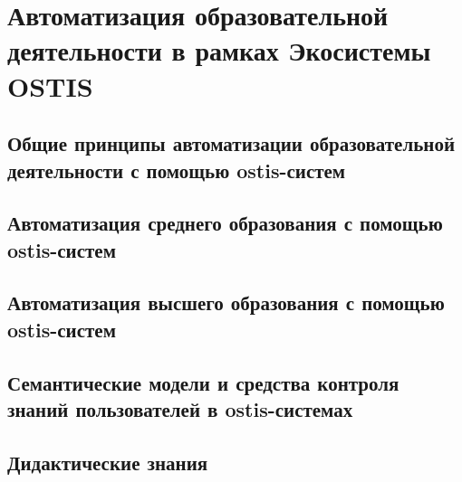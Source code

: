 \chapter{Автоматизация образовательной деятельности в рамках Экосистемы OSTIS}
\label{chapter_learning_systems}


\section{Общие принципы автоматизации образовательной деятельности с помощью ostis-систем}
\section{Автоматизация среднего образования с помощью ostis-систем}
\section{Автоматизация высшего образования с помощью ostis-систем}
\section{Семантические модели и средства контроля знаний пользователей в ostis-системах}
\section{Дидактические знания}
\label{section_knowledge_control}

%